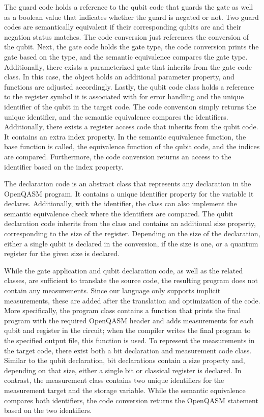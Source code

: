 The guard code holds a reference to the qubit code that guards the gate as well as a boolean value that indicates whether the guard is negated or not. Two guard codes are semantically equivalent if their corresponding qubits are and their negation status matches. The code conversion just references the conversion of the qubit.
Next, the gate code holds the gate type, the code conversion prints the gate based on the type, and the semantic equivalence compares the gate type. Additionally, there exists a parameterized gate that inherits from the gate code class. In this case, the object holds an additional parameter property, and functions are adjusted accordingly. Lastly, the qubit code class holds a reference to the register symbol it is associated with for error handling and the unique identifier of the qubit in the target code. The code conversion simply returns the unique identifier, and the semantic equivalence compares the identifiers. Additionally, there exists a register access code that inherits from the qubit code. It contains an extra index property. In the semantic equivalence function, the base function is called, \ie the equivalence function of the qubit code, and the indices are compared. Furthermore, the code conversion returns an access to the identifier based on the index property.

The declaration code is an abstract class that represents any declaration in the OpenQASM program. It contains a unique identifier property for the variable it declares. Additionally, with the identifier, the class can also implement the semantic equivalence check where the identifiers are compared. The qubit declaration code inherits from the class and contains an additional size property, corresponding to the size of the register. Depending on the size of the declaration, either a single qubit is declared in the conversion, if the size is one, or a quantum register for the given size is declared.

While the gate application and qubit declaration code, as well as the related classes, are sufficient to translate the source code, the resulting program does not contain any measurements. Since our language only supports implicit measurements, these are added after the translation and optimization of the code. More specifically, the program class contains a function that prints the final program with the required OpenQASM header and adds measurements for each qubit and register in the circuit; when the compiler writes the final program to the specified output file, this function is used.
To represent the measurements in the target code, there exist both a bit declaration and measurement code class. Similar to the qubit declaration, bit declarations contain a size property and, depending on that size, either a single bit or classical register is declared. In contrast, the measurement class contains two unique identifiers for the measurement target and the storage variable. While the semantic equivalence compares both identifiers, the code conversion returns the OpenQASM statement based on the two identifiers.

